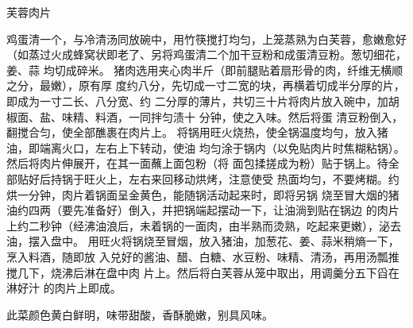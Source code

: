 \begin{recipe}{芙蓉肉片}

\ingredients


\cooking

\step 鸡蛋清一个，与冷清汤同放碗中，用竹筷搅打均匀，上笼蒸熟为白芙蓉，愈嫩愈好
（如蒸过火成蜂窝状即老了、另将鸡蛋清二个加干豆粉和成蛋清豆粉。葱切细花，姜、蒜
均切成碎米。
\step 猪肉选用夹心肉半斤（即前腿贴着扇形骨的肉，纤维无横顺之分，最嫩），原有厚
度约八分，先切成一寸二宽的块，再横着切成半分厚的片，即成为一寸二长、八分宽、约
二分厚的薄片，共切三十片将肉片放入碗中，加胡椒面、盐、味精、料酒，一同拌匀渍十
分钟，使之入味。然后将蛋 清豆粉倒入，翻搅合匀，使全部醮裹在肉片上。
\step 将锅用旺火烧热，使全锅温度均勻，放入猪油，即端离火口，左右上下转动，使油
均匀涂于锅内（以免贴肉片时焦糊粘锅）。然后将肉片伸展开，在其一面蘸上面包粉（将
面包揉搓成为粉）贴于锅上。待全部贴好后持锅于旺火上，左右来回移动烘烤，注意使受
热面均匀，不要烤糊。约烘一分钟，肉片着锅面呈金黄色，能随锅活动起来时，即将另锅
烧至冒大烟的猪油约四两（要先准备好）倒入，并把锅端起摆动一下，让油淌到贴在锅边
的肉片上约二秒钟（经沸油浪后，未着锅的一面肉，由半熟而烫熟，吃起来更嫩），泌去
油，摆入盘中。
\step 用旺火将锅烧至冒烟，放入猪油，加葱花、姜、蒜米稍熵一下，烹入料酒，随即放
入兑好的酱油、醋、白糖、水豆粉、味精、清汤，再用汤瓢推搅几下，烧沸后淋在盘中肉
片上。然后将白芙蓉从笼中取出，用调羹分五下舀在淋好汁 的肉片上即成。

\notes

此菜颜色黄白鲜明，味带甜酸，香酥脆嫩，别具风味。

\end{recipe}

